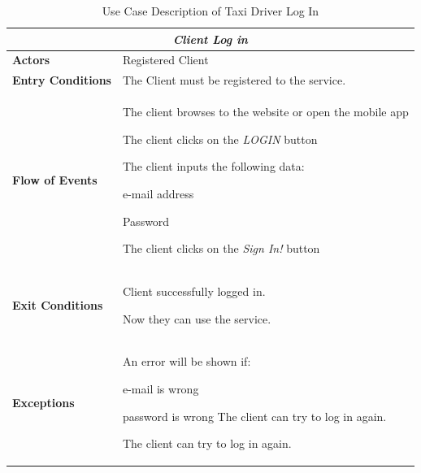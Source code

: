 \documentclass[a4paper]{article}
\begin{document}
\begin{enumerate}[label=\bfseries G\arabic*:]
\begin{table} [H]
\begin{center}
\begin{tabular}{ |m{}|m{}|  }
\hline
    \multicolumn{2}{|c|}{\textbf{\textit{Client Log in}}} \\
\hline \hline
    \textbf{Actors}
&   Registered Client
\\ \hline
    \textbf{Entry Conditions}
&   The Client must be registered to the service.
\\ \hline
    \textbf{Flow of Events}
& 
    \begin{enumerate*}
    \item The client browses to the website or open the mobile app
    \item The client clicks on the \emph{LOGIN} button
    \item The client inputs the following data:
        \begin{enumerate*}
        \item e-mail address
        \item Password
        \end{enumerate*}
    \item The client clicks on the \emph{Sign In!} button
    \end{enumerate*}
\\ \hline
    \textbf{Exit Conditions}
&   Client successfully logged in. 

    Now they can use the service.
\\ \hline
    \textbf{Exceptions}
&   
    An error will be shown if:
    \begin{itemize*}
    \item e-mail is wrong
    \item password is wrong
    The client can try to log in again.
    \end{itemize*}
    The client can try to log in again.
\\ \hline
\end{tabular}
\end{center}
\caption{Use Case Description of Taxi Driver Log In}
\label{table:clientlogin}
\end{table}



\end{enumerate}
\end{document}
